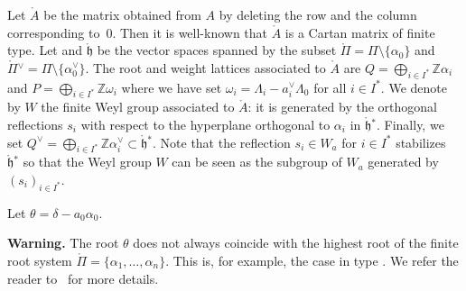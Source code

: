 \documentclass[10pt,a4paper]{amsart}
\numberwithin{equation}{section}
\newcommand{\al}{\alpha}
\newcommand{\fh}{\mathfrak{h}}
\begin{document}
Let $\mathring{A}$
be the matrix obtained from $A$ by deleting the row and the column corresponding to~$0$. Then it is well-known that $\mathring{A}$ is a Cartan matrix of finite type. Let \smash{$\mathring{\fh}{}^\ast$} and $\mathring{\fh}$ be the vector spaces spanned by the subset $\mathring{\Pi} = \Pi\setminus \{\al_0\}$ and $\mathring{\Pi}{}^\vee = \Pi\setminus \bigl\{\al^\vee_0\bigr\}$. The root and weight lattices associated to $\mathring{A}$ are $Q=\bigoplus_{i\in I^\ast}\mathbb{Z}\alpha_{i}$ and $P=\bigoplus_{i\in I^\ast}\mathbb{Z}\omega_{i}$ where we have set $\omega_{i}=\Lambda_{i}-a_{i}^{\vee}\Lambda_{0}$ for all $i\in I^\ast$. We denote by $W$ the finite Weyl group associated to $\mathring{A}$: it is generated by the orthogonal reflections $s_i$ with respect to the hyperplane orthogonal to $\al_i$ in $\mathring{\fh}{}^\ast$. Finally, we set $Q^\vee=\bigoplus_{i\in I^\ast}\mathbb{Z}\alpha^\vee_{i}\subset \mathring{\fh}{}^\ast$. Note that the reflection $s_i\in W_a$ for $i\in I^\ast$ stabilizes~$\mathring{\fh}{}^\ast$ so that the Weyl group $W$ can be seen as the subgroup of $W_a$ generated by $(s_i)_{i\in I^\ast}$.

Let
$
\theta=\delta-a_0\alpha_0$.


\textbf{Warning.} The root $\theta$ does not always coincide with the highest root of the finite root system $\mathring{\Pi} = \{\al_1,\dots,\al_n\}$. This is, for example, the case in type . We refer the reader to~\cite[Proposition~17.18]{carter_affine} for more details.
\end{document}
